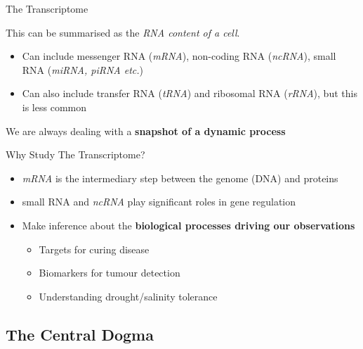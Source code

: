 \documentclass[11pt]{beamer}
\begin{document}
\begin{frame}{The Transcriptome}

	This can be summarised as the \textit{RNA content of a cell}.\\[3mm]
	
	\begin{itemize}
		\item Can include messenger RNA (\textit{mRNA}), non-coding RNA (\textit{ncRNA}), small RNA (\textit{miRNA, piRNA etc.})
		\item Can also include transfer RNA (\textit{tRNA}) and ribosomal RNA (\textit{rRNA}), but this is less common
	\end{itemize}
	
	\vspace{3mm}
	
	We are always dealing with a \textbf{snapshot of a dynamic process}

\end{frame}

\begin{frame}{Why Study The Transcriptome?}

	\begin{itemize}
		\item \textit{mRNA} is the intermediary step between the genome (DNA) and proteins
		\item small RNA and \textit{ncRNA} play significant roles in gene regulation
		\item Make inference about the \textbf{biological processes driving our observations}
		\begin{itemize}
			\item Targets for curing disease
			\item Biomarkers for tumour detection
			\item Understanding drought/salinity tolerance
		\end{itemize}

	\end{itemize}
	
\end{frame}

\subsection{The Central Dogma}
\end{document}
